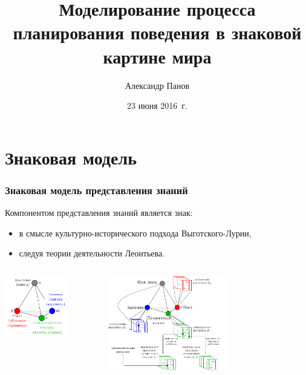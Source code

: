 \documentclass[default]{beamer}
\begin{document}
	
	\title[Планирование в картине мира]{Моделирование процесса планирования поведения в знаковой картине мира}
	\author[Панов]{Александр Панов}
	\date{23 июня 2016~г.} 
	
	\begin{frame}
		\titlepage
	\end{frame}

	\section{Знаковая модель}
	\begin{frame}
		\frametitle{Знаковая модель представления знаний}
		{\footnotesize
			Компонентом представления знаний является знак:
			\begin{itemize}
				\item в смысле культурно-исторического подхода Выготского-Лурии,
				\item следуя теории деятельности Леонтьева.
			\end{itemize}
		}
		\begin{columns}
			\begin{column}{0.4\textwidth}
				\centering
				\includegraphics[width=0.7\textwidth]{signs/sign_color_book_ru}
			\end{column}
			\begin{column}{0.6\textwidth}
				\centering
				\includegraphics[width=0.6\textwidth]{signs/sign_details2_ru}
			\end{column}
		\end{columns}
		

\end{frame}
\end{document}
